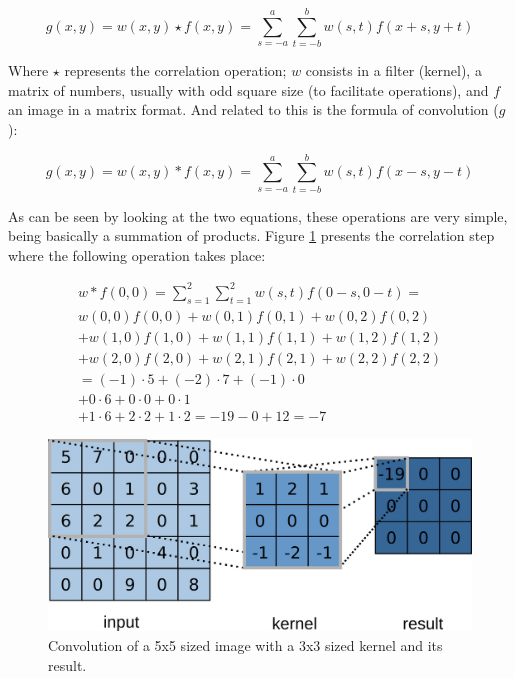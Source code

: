 \begin{equation}
\label{correlation}
g(x,y)=w(x,y)\star f(x,y)=\sum_{s=-a}^a\sum_{t=-b}^bw(s,t)f(x+s,y+t)
\end{equation}

\noindent Where $\star$ represents the correlation operation; $w$ consists in a filter (kernel), a matrix of numbers, usually with odd square size (to facilitate operations), and $f$ an image in a matrix format. And related to this is the formula of convolution ($g$):

\begin{equation}
g(x,y)=w(x,y)\ast f(x,y)=\sum_{s=-a}^a\sum_{t=-b}^bw(s,t)f(x-s,y-t)
\end{equation}

As can be seen by looking at the two equations, these operations are very simple, being basically a summation of products. Figure \ref{fig:figure117} presents the correlation step where the following operation takes place:

\begin{equation}
\begin{split}
w*f(0,0)=\sum_{s=1}^{2}\sum_{t=1}^{2}w(s,t){f}(0-s,0-t)= \\
w(0,0)f(0,0)+w(0,1)f(0,1)+w(0,2)f(0,2) \\
+w(1,0)f(1,0)+w(1,1)f(1,1)+w(1,2)f(1,2) \\
+w(2,0)f(2,0)+w(2,1)f(2,1)+w(2,2)f(2,2)\\
=(-1)\cdot5+(-2)\cdot7+(-1)\cdot0\\
+0\cdot6+0\cdot0+0\cdot1\\
+1\cdot6+2\cdot2+1\cdot2
=-19-0+12=-7
\end{split}
\end{equation}

\begin{figure}
    \centering
    \includegraphics[scale=0.40]{Part 3 - Learning Systems/Supervised Learning/Deep Learning/images/figure117.png}
    \caption{Convolution of a 5x5 sized image with a 3x3 sized kernel and its result.}
    \label{fig:figure117}
\end{figure}

